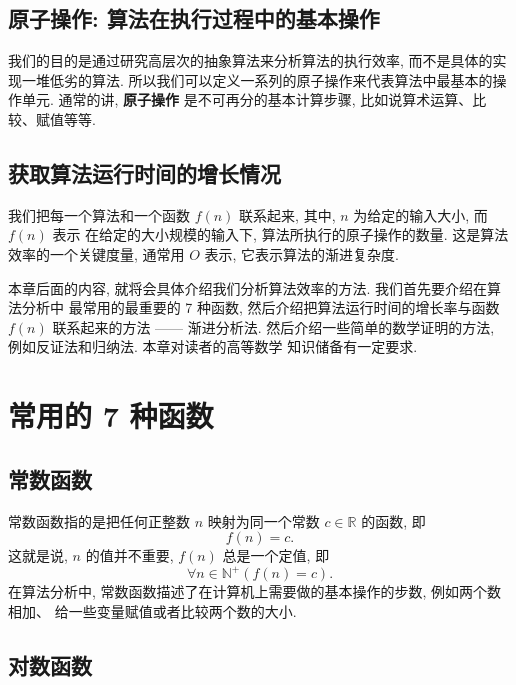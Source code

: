 \documentclass[10pt,UTF8]{book} %
\begin{document}
\subsection{原子操作: 算法在执行过程中的基本操作}

我们的目的是通过研究高层次的抽象算法来分析算法的执行效率, 而不是具体的实现一堆低劣的算法.
所以我们可以定义一系列的原子操作来代表算法中最基本的操作单元. 通常的讲, \textbf{原子操作}
是不可再分的基本计算步骤, 比如说算术运算、比较、赋值等等.

\subsection{获取算法运行时间的增长情况}

我们把每一个算法和一个函数 $f(n)$ 联系起来, 其中, $n$ 为给定的输入大小, 而 $f(n)$ 表示
在给定的大小规模的输入下, 算法所执行的原子操作的数量. 这是算法效率的一个关键度量, 通常用
$O$ 表示, 它表示算法的渐进复杂度.

\vspace*{0.4cm}

本章后面的内容, 就将会具体介绍我们分析算法效率的方法. 我们首先要介绍在算法分析中
最常用的最重要的 7 种函数, 然后介绍把算法运行时间的增长率与函数 $f(n)$ 联系起来的方法
—— 渐进分析法. 然后介绍一些简单的数学证明的方法, 例如反证法和归纳法. 本章对读者的高等数学
知识储备有一定要求.

\section{常用的 7 种函数}

\subsection{常数函数}

常数函数指的是把任何正整数 $n$ 映射为同一个常数 $c \in \mathbb{R}$ 的函数, 即
\[ f(n) = c. \]
这就是说, $n$ 的值并不重要, $f(n)$ 总是一个定值, 即
\[ \forall n \in \mathbb{N}^+ \left(
    f(n) = c
\right). \]
在算法分析中, 常数函数描述了在计算机上需要做的基本操作的步数, 例如两个数相加、
给一些变量赋值或者比较两个数的大小.

\subsection{对数函数}
\end{document}
